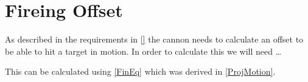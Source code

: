 \section{Fireing Offset}
As described in the requirements in \autoref{} the cannon needs to calculate an
offset to be able to hit a target in motion. In order to calculate this we will
need \ldots \nl


This can be calculated using \autoref{FinEq} which was derived in
\autoref{ProjMotion}.
